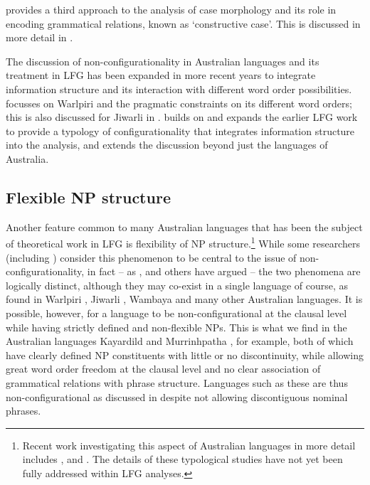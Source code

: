 \documentclass[output=paper,hidelinks]{langscibook}
\begin{document}
\citet{nordlinger1998constructive} provides a third approach to the analysis of case morphology and its role in encoding grammatical relations, known as `constructive case'. This is discussed in more detail in .

The discussion of non-configurationality in Australian languages and its treatment in LFG has been expanded in more recent years to integrate information structure and its interaction with different word order possibilities. \citet{Simpson2007} focusses on Warlpiri and the pragmatic constraints on its different word orders; this is also discussed for Jiwarli in \citet{Austin01}. \citet{Snijders2015} builds on and expands the earlier LFG work to provide a typology of configurationality that integrates information structure into the analysis, and extends the discussion beyond just the languages of Australia.

\subsection{Flexible NP structure}
\label{sec:Australian:FlexibleNP}

Another feature common to many Australian languages that has been the subject of theoretical work in LFG is flexibility of NP structure.\footnote{Recent work investigating this aspect of Australian languages in more detail includes \citet{LouaVers16}, \citet{Louagie2020} and \citet{Reinohl2020}. The details of these typological studies have not yet been fully addressed within LFG analyses.}  While some researchers (including \citealt{Hale83}) consider this phenomenon to be central to the issue of non-configurationality, in fact -- as \citet{AustBres96}, \citet{nordlinger1998constructive} and others have argued -- the two phenomena are logically distinct, although they may co-exist in a single language of course, as found in Warlpiri \citep{Hale83}, Jiwarli \citep{Austin01}, Wambaya \citep{nordlinger1998constructive} and many other Australian languages. It is possible, however, for a language to be non-configurational at the clausal level while having strictly defined and non-flexible NPs. This is what we find in the Australian languages Kayardild \citep{Evans95} and Murrinhpatha \citep{Mujkic-hons}, for example, both of which have clearly defined NP constituents with little or no discontinuity, while allowing great word order freedom at the clausal level and no clear association of grammatical relations with phrase structure. Languages such as these are thus non-configurational as discussed in  despite not allowing discontiguous nominal phrases.
\end{document}

